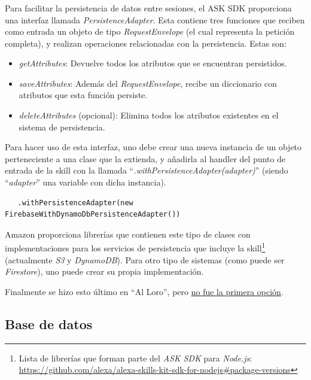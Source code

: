 \documentclass[11pt,spanish,listoffigures,listoftables,table,hyphens,dvipsnames]{tfgetsinf}
\newcommand{\fe}[1]{\foreign{english}{#1}}
\begin{document}
\subsubsection{\fe{PersistenceAdapter}}
\label{seccion:persistence-adapter}

Para facilitar la persistencia de datos entre sesiones, el ASK SDK proporciona una interfaz llamada \emph{PersistenceAdapter}. Esta contiene tres funciones que reciben como entrada un objeto de tipo \emph{RequestEnvelope} (el cual representa la petición completa), y realizan operaciones relacionadas con la persistencia. Estas son:

\begin{itemize}
   \item \emph{getAttributes}: Devuelve todos los atributos que se encuentran persistidos.
   \item \emph{saveAttributes}: Además del \emph{RequestEnvelope}, recibe un diccionario con atributos que esta función persiste.
   \item \emph{deleteAttributes} (opcional): Elimina todos los atributos existentes en el sistema de persistencia.
\end{itemize}

Para hacer uso de esta interfaz, uno debe crear una nueva instancia de un objeto perteneciente a una clase que la extienda, y añadirla al handler del punto de entrada de la skill con la llamada ``\textit{.withPersistenceAdapter(adapter)}'' (siendo ``\textit{adapter}'' una variable con dicha instancia).

\begin{lstlisting}
   .withPersistenceAdapter(new FirebaseWithDynamoDbPersistenceAdapter())
\end{lstlisting}

Amazon proporciona librerías que contienen este tipo de clases con implementaciones para los servicios de persistencia que incluye la skill\footnote{Lista de librerías que forman parte del \emph{ASK SDK} para \emph{Node.js}:\\ \url{https://github.com/alexa/alexa-skills-kit-sdk-for-nodejs\#package-versions}} (actualmente \emph{S3} y \emph{DynamoDB}). Para otro tipo de sistemas (como puede ser \emph{Firestore}), uno puede crear su propia implementación. 

Finalmente se hizo esto último en ``Al Loro'', pero \hyperref[seccion:validacion-bd]{no fue la primera opción}.

\subsection{Base de datos}
\end{document}
